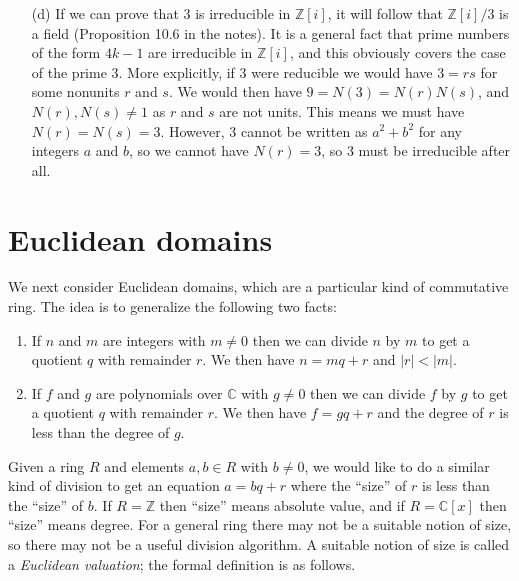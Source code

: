 \documentclass{amsart}
\newcommand{\C}         {{\mathbb{C}}}
\newcommand{\Z}         {{\mathbb{Z}}}
\renewcommand{\:}{\colon}
\theoremstyle{definition}
\renewenvironment{solution}{\SolutionAtEnd}{\endSolutionAtEnd}
\begin{document}
\begin{solution}
\begin{itemize}
  \item[(d)] If we can prove that $3$ is irreducible in $\Z[i]$, it
   will follow that $\Z[i]/3$ is a field (Proposition 10.6 in the
   notes).  It is a general fact that prime numbers of the form $4k-1$
   are irreducible in $\Z[i]$, and this obviously covers the case of
   the prime $3$.  More explicitly, if $3$ were reducible we would
   have $3=rs$ for some nonunits $r$ and $s$.  We would then have
   $9=N(3)=N(r)N(s)$, and $N(r),N(s)\neq 1$ as $r$ and $s$ are not
   units.  This means we must have $N(r)=N(s)=3$.  However, $3$ cannot
   be written as $a^2+b^2$ for any integers $a$ and $b$, so we cannot
   have $N(r)=3$, so $3$ must be irreducible after all.
 \end{itemize}
\end{solution}


\section{Euclidean domains}
\label{sec-euclidean}

We next consider Euclidean domains, which are a particular kind of
commutative ring.  The idea is to generalize the following two facts:
\begin{enumerate}
\item If $n$ and $m$ are integers with $m\neq 0$ then we can divide
 $n$ by $m$ to get a quotient $q$ with remainder $r$.  We then have
 $n=mq+r$ and $|r|<|m|$.
\item If $f$ and $g$ are polynomials over $\C$ with $g\neq 0$ then we
 can divide $f$ by $g$ to get a quotient $q$ with remainder $r$.  We
 then have $f=gq+r$ and the degree of $r$ is less than the degree of
 $g$. 
\end{enumerate}
Given a ring $R$ and elements $a,b\in R$ with $b\neq 0$, we would like
to do a similar kind of division to get an equation $a=bq+r$ where the
``size'' of $r$ is less than the ``size'' of $b$.  If $R=\Z$ then
``size'' means absolute value, and if $R=\C[x]$ then ``size'' means
degree.  For a general ring there may not be a suitable notion of
size, so there may not be a useful division algorithm.  A suitable
notion of size is called a \emph{Euclidean valuation}; the formal
definition is as follows.
\end{document}
